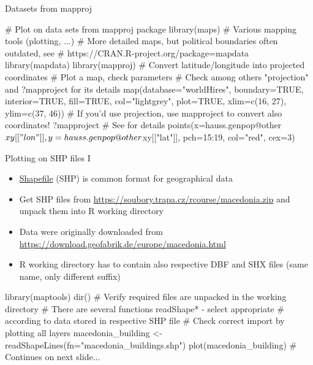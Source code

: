 \documentclass[compress, ucs, xelatex, 11pt, xcolor=svgnames, aspectratio=169,
	hyperref={
		bookmarks=true,
		unicode=true,
		colorlinks=true,
		pdftitle={Molecular data in R},
		plainpages=false,
		pdfauthor={Vojtech Zeisek},
		pdfsubject={Course about phylogeny and evolution in R},
		pdfcreator={XeLaTeX},
		pdfkeywords={R, evolution, phylogeny, molecular data},
		linkcolor=Crimson, %
		anchorcolor=Magenta, %
		citecolor=Magenta, %
		filecolor=Magenta, %
		menucolor=Magenta, %
		urlcolor=DodgerBlue, %
		pdftex},
	url={hyphens, lowtilde} %
	]{beamer}
\begin{document}
\begin{frame}[fragile]{Datasets from mapproj}
	\begin{spluscode}
    # Plot on data sets from mapproj package
    library(maps) # Various mapping tools (plotting, ...)
    # More detailed maps, but political boundaries often outdated, see
    # https://CRAN.R-project.org/package=mapdata
    library(mapdata)
    library(mapproj)
    # Convert latitude/longitude into projected coordinates
    # Plot a map, check parameters
    # Check among others "projection" and ?mapproject for its details
    map(database="worldHires", boundary=TRUE, interior=TRUE, fill=TRUE,
      col="lightgrey", plot=TRUE, xlim=c(16, 27), ylim=c(37, 46))
    # If you'd use projection, use mapproject to convert also coordinates!
    ?mapproject # See for details
    points(x=hauss.genpop@other$xy[["lon"]], y=hauss.genpop@other$xy[["lat"]],
      pch=15:19, col="red", cex=3)
	\end{spluscode}
\end{frame}

\begin{frame}[fragile]{Plotting on SHP files I}
	\begin{itemize}
		\item \href{https://en.wikipedia.org/wiki/Shapefile}{Shapefile} (SHP) is common format for geographical data
		\item Get SHP files from \url{https://soubory.trapa.cz/rcourse/macedonia.zip} and unpack them into R working directory
		\item Data were originally downloaded from \url{https://download.geofabrik.de/europe/macedonia.html}
		\item R working directory has to contain also respective DBF and SHX files (same name, only different suffix)
	\end{itemize}
	\begin{spluscode}
    library(maptools)
    dir() # Verify required files are unpacked in the working directory
    # There are several functions readShape* - select appropriate
    # according to data stored in respective SHP file
    # Check correct import by plotting all layers
    macedonia_building <- readShapeLines(fn="macedonia_buildings.shp")
    plot(macedonia_building) # Continues on next slide...
	\end{spluscode}
\end{frame}
\end{document}
